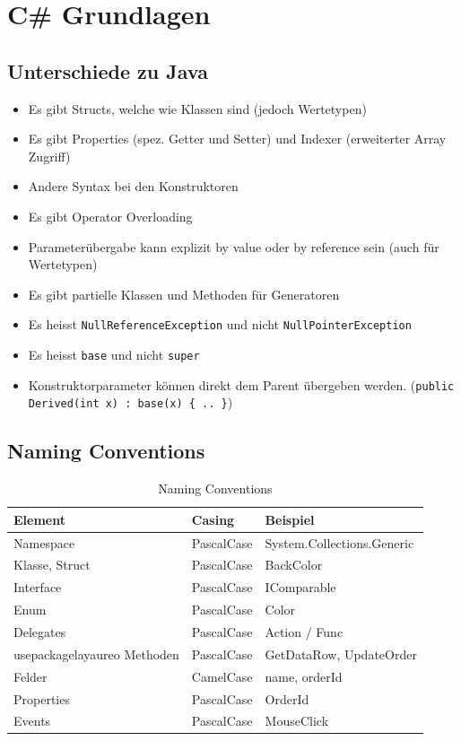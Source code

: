 \documentclass[
a4paper,
oneside,
10pt,
fleqn,
headsepline,
toc=listofnumbered, 
bibliography=totocnumbered]{scrartcl}
\let\stdsection\section
\renewcommand\section{\clearpage\stdsection}
\begin{document}
\section{C\# Grundlagen}
\subsection{Unterschiede zu Java}
\begin{itemize}
	\item Es gibt Structs, welche wie Klassen sind (jedoch Wertetypen)
	\item Es gibt Properties (spez. Getter und Setter) und Indexer (erweiterter Array Zugriff)
	\item Andere Syntax bei den Konstruktoren
	\item Es gibt Operator Overloading
	\item Parameterübergabe kann explizit by value oder by reference sein (auch für Wertetypen)
	\item Es gibt partielle Klassen und Methoden für Generatoren
	\item Es heisst \lstinline|NullReferenceException| und nicht \lstinline|NullPointerException|
	\item Es heisst \lstinline|base| und nicht \lstinline|super|
	\item Konstruktorparameter können direkt dem Parent übergeben werden. (\lstinline|public Derived(int x) : base(x) { .. }|)
\end{itemize}

\subsection{Naming Conventions}
\begin{table}[ht]
	\centering
	\begin{tabu} to \linewidth {l l l}
		\toprule
		Element        & Casing     & Beispiel                   \\
		\midrule
		Namespace      & PascalCase & System.Collections.Generic \\
		Klasse, Struct & PascalCase & BackColor                  \\
		Interface      & PascalCase & IComparable                \\
		Enum           & PascalCase & Color                      \\
		Delegates      & PascalCase & Action / Func              \\usepackage{layaureo}
		Methoden       & PascalCase & GetDataRow, UpdateOrder    \\
		Felder         & CamelCase  & name, orderId              \\
		Properties     & PascalCase & OrderId                    \\
		Events         & PascalCase & MouseClick                 \\
		\bottomrule
	\end{tabu}
	\caption{Naming Conventions}
\end{table}
\end{document}
